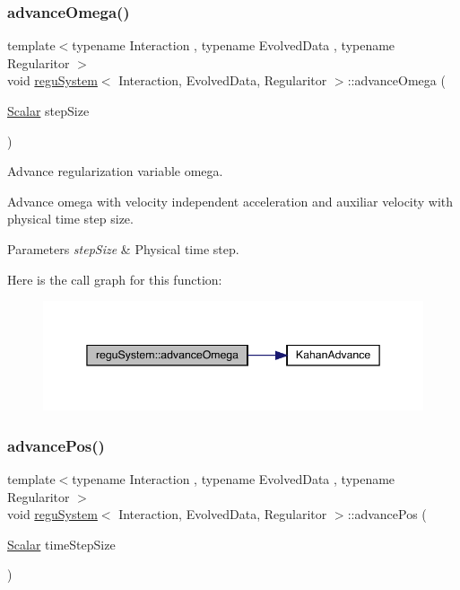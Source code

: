 \subsubsection{\texorpdfstring{advance\+Omega()}{advanceOmega()}}
{\footnotesize\ttfamily template$<$typename Interaction , typename Evolved\+Data , typename Regularitor $>$ \\
void \mbox{\hyperlink{classregu_system}{regu\+System}}$<$ Interaction, Evolved\+Data, Regularitor $>$\+::advance\+Omega (\begin{DoxyParamCaption}\item[{\mbox{\hyperlink{classregu_system_aca8ee2c387943164ee3ea68370fc3ac0}{Scalar}}}]{step\+Size }\end{DoxyParamCaption})\hspace{0.3cm}{\ttfamily [private]}}



Advance regularization variable omega. 

Advance omega with velocity independent acceleration and auxiliar velocity with physical time step size. 
\begin{DoxyParams}{Parameters}
{\em step\+Size} & Physical time step. \\
\hline
\end{DoxyParams}
Here is the call graph for this function\+:
\nopagebreak
\begin{figure}[H]
\begin{center}
\leavevmode
\includegraphics[width=345pt]{classregu_system_ad04ed572a5718219d506af6cd924a395_cgraph}
\end{center}
\end{figure}
\mbox{\label{classregu_system_ab1964e22d3d7f6ddaa51c5e7a02534a5}} 
\subsubsection{\texorpdfstring{advance\+Pos()}{advancePos()}}
{\footnotesize\ttfamily template$<$typename Interaction , typename Evolved\+Data , typename Regularitor $>$ \\
void \mbox{\hyperlink{classregu_system}{regu\+System}}$<$ Interaction, Evolved\+Data, Regularitor $>$\+::advance\+Pos (\begin{DoxyParamCaption}\item[{\mbox{\hyperlink{classregu_system_aca8ee2c387943164ee3ea68370fc3ac0}{Scalar}}}]{time\+Step\+Size }\end{DoxyParamCaption})}



